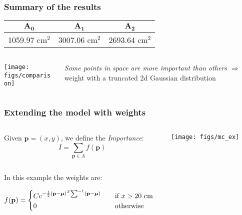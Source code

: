 \documentclass{beamer}
\begin{document}
\begin{frame}
\frametitle{Summary of the results}

\begin{table}[!h]
\begin{center}
\begin{tabular}{|c|c|c|}
\hline
\bf $\mathbf{A_0}$ & \bf $\mathbf{A_1}$ & \bf $\mathbf{A_2}$ \\  \hline

1059.97 cm$^2$ & 3007.06 cm$^2$ &   2693.64 cm$^2$ \\\hline

\end{tabular}
\end{center}
\end{table}

\begin{columns}
\begin{column}{0.5\textwidth}
\texttt{[image: figs/comparison]}
\end{column}

\begin{column}{0.5\textwidth}


\textit{Some points in space are more important than others} $\Rightarrow$ weight with a truncated 2d Gaussian distribution

\end{column}
\end{columns}

\end{frame}


\begin{frame}
\frametitle{Extending the model with weights}

\begin{columns}
\begin{column}{0.45\textwidth}
Given $\mathbf{p}=(x,y)$, we define the \textit{Importance}:
$$
I=\sum_{\mathbf{p}\in A} f(\mathbf{p})
$$

\end{column}
\begin{column}{0.55\textwidth}
\texttt{[image: figs/mc\_ex]}

\end{column}
\end{columns}
In this example the weights are:

\begin{flushleft}
$
f(\mathbf{p})=
\begin{cases}
C e^{-\frac{1}{2}(\mathbf{p}-\text{\boldmath $\mu$})^T\mathbf{\sum}^{-1}(\mathbf{p}-\text{\boldmath $\mu$})} \quad & \text{if } x>20\text{ cm} \\
0 & \text{otherwise}
\end{cases}
$
\end{flushleft}



\end{frame}
\end{document}

